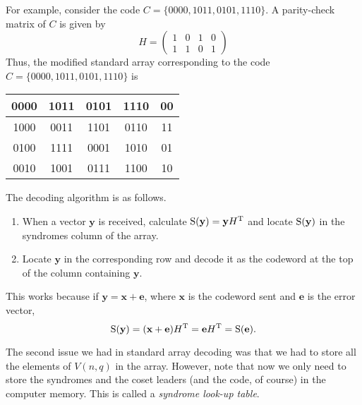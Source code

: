 \vspace{2mm}
For example, consider the code $C=\{0000,1011,0101,1110\}$. A parity-check matrix of $C$ is given by
$$
H=
\begin{pmatrix}
    1 & 0 & 1 & 0 \\
    1 & 1 & 0 & 1
\end{pmatrix}
$$
Thus, the modified standard array corresponding to the code $C=\{0000,1011,0101,1110\}$ is
\begin{center}
\begin{tabular}{|c|c|c|c|c|}
    \hline
     0000 & 1011 & 0101 & 1110 & 00 \\ \hline
     1000 & 0011 & 1101 & 0110 & 11 \\ \hline
     0100 & 1111 & 0001 & 1010 & 01 \\ \hline
     0010 & 1001 & 0111 & 1100 & 10 \\ \hline
\end{tabular}
\end{center}

The decoding algorithm is as follows.
\begin{enumerate}
    \item When a vector $\textbf{y}$ is received, calculate $\operatorname{S}(\textbf{y})=\textbf{y}H^\text{T}$ and locate $\operatorname{S}(\textbf{y})$ in the syndromes column of the array.
    \item Locate $\textbf{y}$ in the corresponding row and decode it as the codeword at the top of the column containing $\textbf{y}$.
\end{enumerate}

This works because if $\textbf{y}=\textbf{x}+\textbf{e}$, where $\textbf{x}$ is the codeword sent and $\textbf{e}$ is the error vector, $$\operatorname{S}(\textbf{y})=(\textbf{x}+\textbf{e})H^\text{T}=\textbf{e}H^\text{T}=\operatorname{S}(\textbf{e}).$$

The second issue we had in standard array decoding was that we had to store all the elements of $V(n,q)$ in the array. However, note that now we only need to store the syndromes and the coset leaders (and the code, of course) in the computer memory. This is called a \textit{syndrome look-up table}.


\clearpage